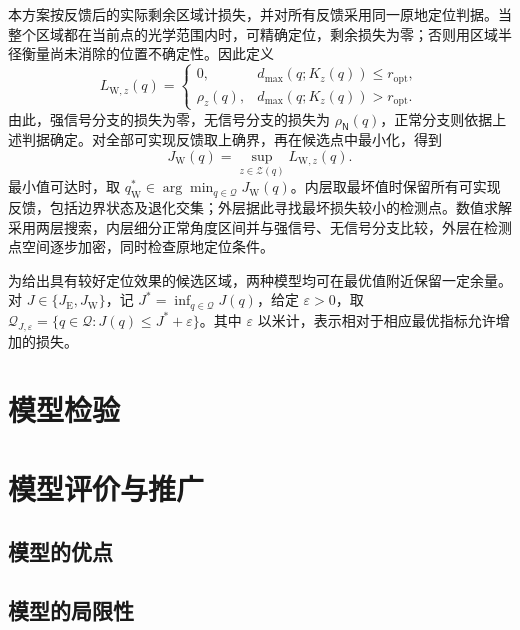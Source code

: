 \documentclass[UTF8,a4paper,zihao=-4,fontset=none]{ctexart}
\begin{document}
本方案按反馈后的实际剩余区域计损失，并对所有反馈采用同一原地定位判据。当整个区域都在当前点的光学范围内时，可精确定位，剩余损失为零；否则用区域半径衡量尚未消除的位置不确定性。因此定义
\begin{equation}
 L_{\mathrm W,z}(q)=
 \begin{cases}
 0,&d_{\max}(q;K_z(q))\le r_{\mathrm{opt}},\\
 \rho_z(q),&d_{\max}(q;K_z(q))>r_{\mathrm{opt}}.
 \end{cases}
\label{eq:q2-pair-worst-loss}
\end{equation}
由此，强信号分支的损失为零，无信号分支的损失为 \(\rho_{\mathsf N}(q)\)，正常分支则依据上述判据确定。对全部可实现反馈取上确界，再在候选点中最小化，得到
\begin{equation}
 J_{\mathrm W}(q)=\sup_{z\in\mathcal Z(q)}L_{\mathrm W,z}(q).
\label{eq:q2-pair-worst-objective}
\end{equation}
最小值可达时，取 \(q_{\mathrm W}^*\in\arg\min_{q\in\mathcal Q}J_{\mathrm W}(q)\)。内层取最坏值时保留所有可实现反馈，包括边界状态及退化交集；外层据此寻找最坏损失较小的检测点。数值求解采用两层搜索，内层细分正常角度区间并与强信号、无信号分支比较，外层在检测点空间逐步加密，同时检查原地定位条件。

为给出具有较好定位效果的候选区域，两种模型均可在最优值附近保留一定余量。对 \(J\in\{J_{\mathrm E},J_{\mathrm W}\}\)，记 \(J^*=\inf_{q\in\mathcal Q}J(q)\)，给定 \(\varepsilon>0\)，取 \(\mathcal Q_{J,\varepsilon}=\{q\in\mathcal Q:J(q)\le J^*+\varepsilon\}\)。其中 \(\varepsilon\) 以米计，表示相对于相应最优指标允许增加的损失。




\section{模型检验}


\section{模型评价与推广}

\subsection{模型的优点}


\subsection{模型的局限性}
\end{document}
